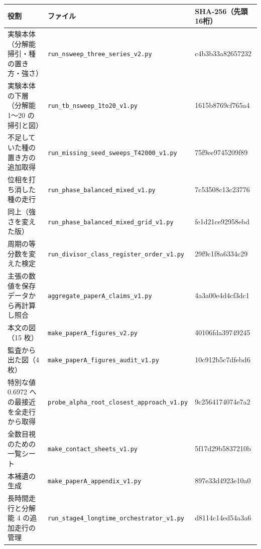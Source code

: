 \documentclass[
]{ltjsarticle}
\newcounter{none} %
\begin{document}
{\def\LTcaptype{none} %
\begin{longtable}[]{@{}
  >{\raggedright\arraybackslash}p{}
  >{\raggedright\arraybackslash}p{}
  >{\raggedright\arraybackslash}p{}@{}}
\toprule\noalign{}
\begin{minipage}[b]{\linewidth}\raggedright
役割
\end{minipage} & \begin{minipage}[b]{\linewidth}\raggedright
ファイル
\end{minipage} & \begin{minipage}[b]{\linewidth}\raggedright
SHA-256（先頭16桁）
\end{minipage} \\
\midrule\noalign{}
\endhead
\bottomrule\noalign{}
\endlastfoot
実験本体（分解能掃引・種の置き方・強さ） &
\texttt{run\_nsweep\_three\_series\_v2.py} & c4b3b33a82657232 \\
実験本体の下層（分解能 1〜20 の掃引と図） &
\texttt{run\_tb\_nsweep\_1to20\_v1.py} & 1615b8769cf765a4 \\
不足していた種の置き方の追加取得 &
\texttt{run\_missing\_seed\_sweeps\_T42000\_v1.py} & 75f9ee9745209f89 \\
位相を打ち消した種の走行 & \texttt{run\_phase\_balanced\_mixed\_v1.py} &
7c53508c13c23776 \\
同上（強さを変えた版） &
\texttt{run\_phase\_balanced\_mixed\_grid\_v1.py} & fe1d21ce92958ebd \\
周期の等分数を変えた検定 &
\texttt{run\_divisor\_class\_register\_order\_v1.py} &
29f9c1f8a6334c29 \\
主張の数値を保存データから再計算し照合 &
\texttt{aggregate\_paperA\_claims\_v1.py} & 4a3a00e4d4cf3dc1 \\
本文の図（15 枚） & \texttt{make\_paperA\_figures\_v2.py} &
40106fda39749245 \\
監査から出た図（4 枚） & \texttt{make\_paperA\_figures\_audit\_v1.py} &
10c912b5c7dfebd6 \\
特別な値 0.6972 への最接近を全走行から取得 &
\texttt{probe\_alpha\_root\_closest\_approach\_v1.py} &
9c2564174074e7a2 \\
全数目視のための一覧シート & \texttt{make\_contact\_sheets\_v1.py} &
5f17d29b5837210b \\
本補遺の生成 & \texttt{make\_paperA\_appendix\_v1.py} &
897e33d4923e10a0 \\
長時間走行と分解能 4 の追加走行の管理 &
\texttt{run\_stage4\_longtime\_orchestrator\_v1.py} &
d8114c14ed54a3a6 \\
\end{longtable}
}
\end{document}
